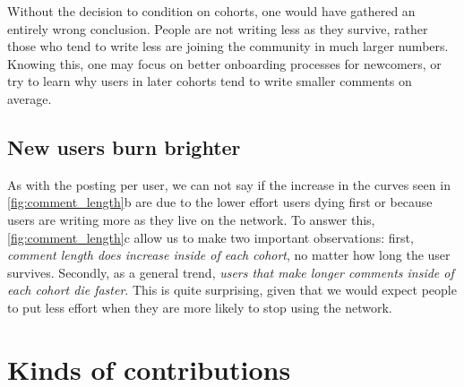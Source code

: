 Without the decision to condition on cohorts, one would have gathered an entirely wrong conclusion. People are not writing less as they survive, rather those who tend to write less are joining the community in much larger numbers. Knowing this, one may focus on better onboarding processes for newcomers, or try to learn why users in later cohorts tend to write smaller comments on average.  

\subsection{New users burn brighter}
As with the posting per user, we can not say if the increase in the curves seen in \ref{fig:comment_length}b are due to the lower effort users dying first or because users are writing more as they live on the network. To answer this, \ref{fig:comment_length}c allow us to make two important observations: first, \textit{comment length does increase inside of each cohort}, no matter how long the user survives. Secondly, as a general trend, \textit{users that make longer comments inside of each cohort die faster}. This is quite surprising, given that we would expect people to put less effort when they are more likely to stop using the network.

\section{Kinds of contributions}

